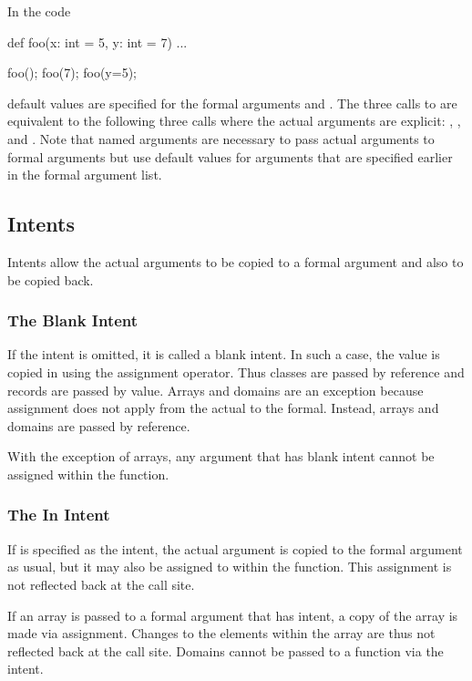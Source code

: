 \begin{example}
In the code
\begin{chapel}
def foo(x: int = 5, y: int = 7) { ... }

foo();
foo(7);
foo(y=5);
\end{chapel}
default values are specified for the formal arguments 
and .  The three calls to  are equivalent to the
following three calls where the actual arguments are
explicit: , , and .
Note that named arguments are necessary to pass actual arguments to
formal arguments but use default values for arguments that are
specified earlier in the formal argument list.
\end{example}

\subsection{Intents}
\label{Intents}

Intents allow the actual arguments to be copied to a formal argument
and also to be copied back.

\subsubsection{The Blank Intent}
\label{The_Blank_Intent}

If the intent is omitted, it is called a blank intent.  In such a
case, the value is copied in using the assignment operator.  Thus
classes are passed by reference and records are passed by value.
Arrays and domains are an exception because assignment does not apply
from the actual to the formal.  Instead, arrays and domains are passed
by reference.

With the exception of arrays, any argument that has blank intent
cannot be assigned within the function.

\subsubsection{The In Intent}
\label{The_In_Intent}

If  is specified as the intent, the actual argument is copied
to the formal argument as usual, but it may also be assigned to within
the function.  This assignment is not reflected back at the call site.

If an array is passed to a formal argument that has  intent,
a copy of the array is made via assignment.  Changes to the elements
within the array are thus not reflected back at the call site.
Domains cannot be passed to a function via the  intent.

